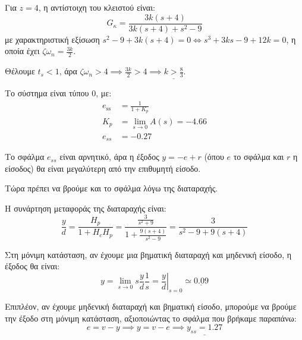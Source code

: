 \documentclass[11pt,a4paper,notitlepage,fleqn,final]{article}
\begin{document}
\begin{exercise}
\begin{enumgreekparen}
	
	Για \( z=4 \), η αντίστοιχη του κλειστού είναι:
	\[
	G_κ = \frac{3k(s+4)}{3k(s+4)+s^2-9}
	\]
	με χαρακτηριστική εξίσωση \( s^2-9+3k(s+4) = 0 \iff s^3+3ks -9 + 12k = 0 \), η οποία
	έχει \( ζ\omega_n = \frac{3k}{2} \).
	
	Θέλουμε \( t_s < 1 \), άρα \( ζ\omega_n > 4 \implies \frac{3k}{2}>4 \implies
	\underline{k > \frac{8}{3}} \).
	
	\item
	Το σύστημα είναι τύπου 0, με:
	\begin{align*}
		e_{\mathrm{ss}} &= \frac{1}{1+K_p} \\
		K_p &= \lim_{s\to 0} A(s) = -4.66 \\
		e_{ss} &= -0.27
	\end{align*}
	
	Το σφάλμα \( e_{ss} \) είναι αρνητικό, άρα η έξοδος \( y = -e + r \) (όπου \( e \) το
	σφάλμα και \( r \) η είσοδος) θα είναι μεγαλύτερη από την επιθυμητή είσοδο.
	
	Τώρα πρέπει να βρούμε και το σφάλμα λόγω της διαταραχής.
	
	Η συνάρτηση μεταφοράς της διαταραχής είναι:
	\[
	\frac{y}{d} = \frac{H_p}{1+H_cH_p} = \frac{\frac{3}{s^2+9}}{1+\frac{9(s+4)}{s^2-9}}
	= \frac{3}{s^2-9+9(s+4)}
	\]
	
	Στη μόνιμη κατάσταση, αν έχουμε μια βηματική διαταραχή και μηδενική είσοδο, η έξοδος
	θα είναι:
	\[
	y = \lim_{s\to 0}s\frac{y}{d}\frac{1}{s} = \left.\frac{y}{d}\right|_{s=0}
	\simeq \underline{0.09}
	\]
	
	Επιπλέον, αν έχουμε μηδενική διαταραχή και βηματική είσοδο, μπορούμε να βρούμε την
	έξοδο στη μόνιμη κατάσταση, αξιοποιώντας το σφάλμα που βρήκαμε παραπάνω:
	\[
	e=v-y \implies y=v-e \implies \underline{y_{ss}= 1.27}
	\]
	

\end{enumgreekparen}
\end{exercise}
\end{document}
